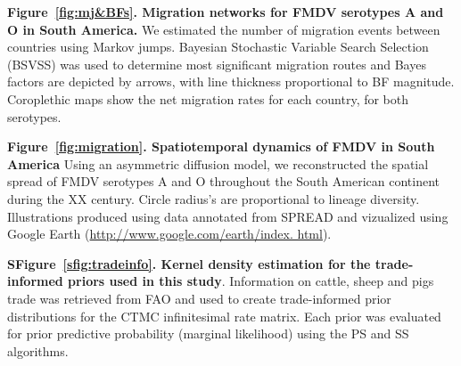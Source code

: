 \documentclass[10pt]{article}
\begin{document}
{\bf Figure~\ref{fig:mj&BFs}. Migration networks for FMDV serotypes A and O in South America.} We estimated the number of migration events between countries using Markov jumps.  Bayesian Stochastic Variable Search Selection (BSVSS) was used to determine most significant migration routes and Bayes factors are depicted by arrows, with line thickness proportional to BF magnitude. Coroplethic maps show the net migration rates for each country, for both serotypes.

{\bf Figure~\ref{fig:migration}. Spatiotemporal dynamics of FMDV in South America} Using an asymmetric diffusion model, we reconstructed the spatial spread of FMDV serotypes A and O throughout the South American continent during the XX century. Circle radius's are proportional to lineage diversity. Illustrations produced using data annotated from SPREAD \cite{spread} and vizualized using Google Earth (\url{http://www.google.com/earth/index.
html}).

{\bf SFigure~\ref{sfig:tradeinfo}. Kernel density estimation for the trade-informed priors used in this study}. Information on cattle, sheep and pigs trade was retrieved from FAO and used to create trade-informed prior distributions for the CTMC infinitesimal rate matrix. Each prior was evaluated for prior predictive probability (marginal likelihood) using the PS and SS algorithms.

\newpage
\end{document}
